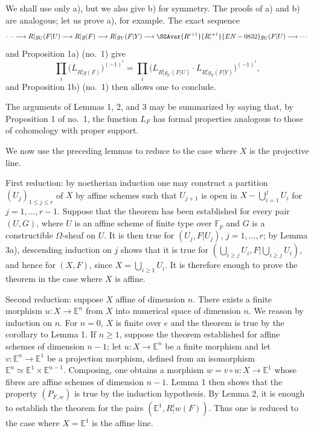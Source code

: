 We shall use only a), but we also give b) for symmetry. The proofs of a) and b) are analogous; let us prove a), for example. The exact sequence
\[
\cdots\longrightarrow R^i_!g_U(F|U)\longrightarrow R^i_!g(F)
\longrightarrow R^i_!g_Y(F|Y)\longrightarrow \SGAvar{R^{i+1}}{R^{i+1}_!}{EN-0832}g_U(F|U)\longrightarrow\cdots
\]
and Proposition 1a) (no.~1) give
\[
\prod_i\bigl(L_{R^i_!g(F)}\bigr)^{(-1)^i}
=\prod_i\bigl(L_{R^i_!g_U(F|U)}\cdot L_{R^i_!g_Y(F|Y)}\bigr)^{(-1)^i},
\]
and Proposition 1b) (no.~1) then allows one to conclude.

The arguments of Lemmas 1, 2, and 3 may be summarized by saying that, by Proposition 1 of no.~1, the function $L_F$ has formal properties analogous to those of cohomology with proper support.

We now use the preceding lemmas to reduce to the case where $X$ is the projective line.

First reduction: by noetherian induction one may construct a partition $(U_j)_{1\le j\le r}$ of $X$ by affine schemes such that $U_{j+1}$ is open in $X-\bigcup_{i=1}^jU_i$ for $j=1,\ldots,r-1$. Suppose that the theorem has been established for every pair $(U,G)$, where $U$ is an affine scheme of finite type over $\mathbb F_p$ and $G$ is a constructible $\Omega$-sheaf on $U$. It is then true for $(U_j,F|U_j)$, $j=1,\ldots,r$; by Lemma 3a), descending induction on $j$ shows that it is true for $(\bigcup_{i\ge j}U_i,F|\bigcup_{i\ge j}U_i)$, and hence for $(X,F)$, since $X=\bigcup_{i\ge1}U_i$. It is therefore enough to prove the theorem in the case where $X$ is affine.

Second reduction: suppose $X$ affine of dimension $n$. There exists a finite morphism $u:X\to\mathbb E^n$ from $X$ into numerical space of dimension $n$. We reason by induction on $n$. For $n=0$, $X$ is finite over $e$ and the theorem is true by the corollary to Lemma 1. If $n\ge1$, suppose the theorem established for affine schemes of dimension $n-1$; let $u:X\to\mathbb E^n$ be a finite morphism and let $v:\mathbb E^n\to\mathbb E^1$ be a projection morphism, defined from an isomorphism $\mathbb E^n\simeq\mathbb E^1\times\mathbb E^{n-1}$. Composing, one obtains a morphism $w=v\circ u:X\to\mathbb E^1$ whose fibres are affine schemes of dimension $n-1$. Lemma 1 then shows that the property $(P_{F,w})$ is true by the induction hypothesis. By Lemma 2, it is enough to establish the theorem for the pairs $(\mathbb E^1,R^i_!w(F))$. Thus one is reduced to the case where $X=\mathbb E^1$ is the affine line.

